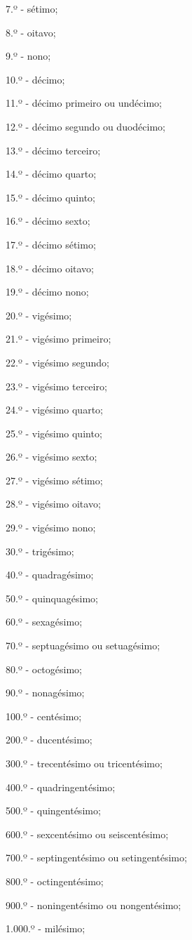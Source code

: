 \begin{multicols*}{2}
\begin{enumerate}
7.º - sétimo;

8.º - oitavo;

9.º - nono;

10.º - décimo;

11.º - décimo primeiro ou undécimo;

12.º - décimo segundo ou duodécimo;

13.º - décimo terceiro;

14.º - décimo quarto;

15.º - décimo quinto;

16.º - décimo sexto;

17.º - décimo sétimo;

18.º - décimo oitavo;

19.º - décimo nono;

20.º - vigésimo;

21.º - vigésimo primeiro;

22.º - vigésimo segundo;

23.º - vigésimo terceiro;

24.º - vigésimo quarto;

25.º - vigésimo quinto;

26.º - vigésimo sexto;

27.º - vigésimo sétimo;

28.º - vigésimo oitavo;

29.º - vigésimo nono;

30.º - trigésimo;

40.º - quadragésimo;

50.º - quinquagésimo;

60.º - sexagésimo;

70.º - septuagésimo ou setuagésimo;

80.º - octogésimo;

90.º - nonagésimo;

100.º - centésimo;

200.º - ducentésimo;

300.º - trecentésimo ou tricentésimo;

400.º - quadringentésimo;

500.º - quingentésimo;

600.º - sexcentésimo ou seiscentésimo;

700.º - septingentésimo ou setingentésimo;

800.º - octingentésimo;

900.º - noningentésimo ou nongentésimo;

1.000.º - milésimo;


\end{enumerate}
\end{multicols*}
